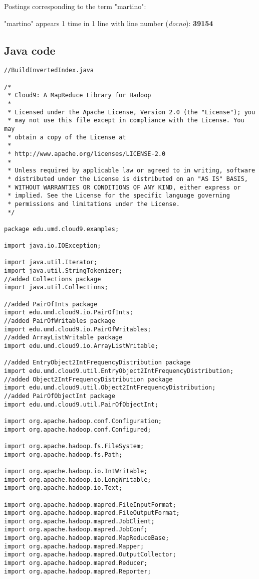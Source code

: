 \documentclass{article} %
\begin{document}
Postings corresponding to the term "martino":

"martino" appears 1 time in 1 line with line number (\textit{docno}): \textbf{39154}

\subsection*{Java code}

\begin{lstlisting}[style=Java]
//BuildInvertedIndex.java

/*
 * Cloud9: A MapReduce Library for Hadoop
 * 
 * Licensed under the Apache License, Version 2.0 (the "License"); you
 * may not use this file except in compliance with the License. You may
 * obtain a copy of the License at
 *
 * http://www.apache.org/licenses/LICENSE-2.0 
 *
 * Unless required by applicable law or agreed to in writing, software
 * distributed under the License is distributed on an "AS IS" BASIS,
 * WITHOUT WARRANTIES OR CONDITIONS OF ANY KIND, either express or
 * implied. See the License for the specific language governing
 * permissions and limitations under the License.
 */

package edu.umd.cloud9.examples;

import java.io.IOException;

import java.util.Iterator;
import java.util.StringTokenizer;
//added Collections package
import java.util.Collections;

//added PairOfInts package
import edu.umd.cloud9.io.PairOfInts;
//added PairOfWritables package
import edu.umd.cloud9.io.PairOfWritables;
//added ArrayListWritable package
import edu.umd.cloud9.io.ArrayListWritable;

//added EntryObject2IntFrequencyDistribution package
import edu.umd.cloud9.util.EntryObject2IntFrequencyDistribution;
//added Object2IntFrequencyDistribution package
import edu.umd.cloud9.util.Object2IntFrequencyDistribution;
//added PairOfObjectInt package
import edu.umd.cloud9.util.PairOfObjectInt;

import org.apache.hadoop.conf.Configuration;
import org.apache.hadoop.conf.Configured;

import org.apache.hadoop.fs.FileSystem;
import org.apache.hadoop.fs.Path;

import org.apache.hadoop.io.IntWritable;
import org.apache.hadoop.io.LongWritable;
import org.apache.hadoop.io.Text;

import org.apache.hadoop.mapred.FileInputFormat;
import org.apache.hadoop.mapred.FileOutputFormat;
import org.apache.hadoop.mapred.JobClient;
import org.apache.hadoop.mapred.JobConf;
import org.apache.hadoop.mapred.MapReduceBase;
import org.apache.hadoop.mapred.Mapper;
import org.apache.hadoop.mapred.OutputCollector;
import org.apache.hadoop.mapred.Reducer;
import org.apache.hadoop.mapred.Reporter;


\end{lstlisting}
\end{document}
